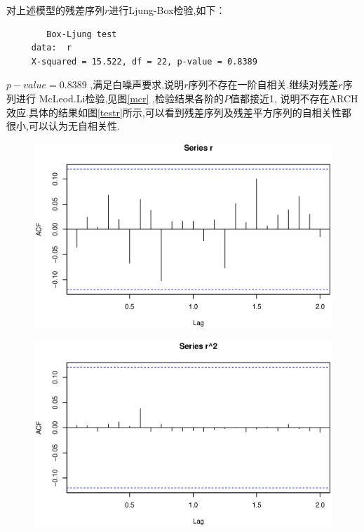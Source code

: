 对上述模型的残差序列$r$进行Ljung-Box检验,如下：
\begin{framed}
\begin{verbatim} 
 	 	Box-Ljung test	 
 	 data:  r
 	 X-squared = 15.522, df = 22, p-value = 0.8389
\end{verbatim}
\end{framed}
$p-value=0.8389$ ,满足白噪声要求,说明$r$序列不存在一阶自相关.继续对残差$r$序列进行 McLeod.Li检验,见图\ref{mcr} ,检验结果各阶的$P$值都接近1, 说明不存在ARCH效应.具体的结果如图\ref{testr}所示,可以看到残差序列及残差平方序列的自相关性都很小,可以认为无自相关性.
\begin{figure}[h!]
	\begin{minipage}[ht]{0.31\textwidth}
		\centering
		\includegraphics[width=\textwidth]{pic/ast/acfr}
		\subcaption{}\label{acfr}
	\end{minipage}%
	\hspace{0.02\textwidth}
	\begin{minipage}[ht]{0.31\textwidth}
		\centering
		\includegraphics[width=\textwidth]{pic/ast/acfr2}

\end{minipage}
\end{figure}
